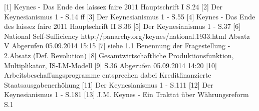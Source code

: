 \documentclass[
      onecolumn,
      a4paper,
      abstracton,
      parskip=half
      ,final
      ]{scrartcl}
\begin{document}
[1] Keynes - Das Ende des laissez faire 2011 Hauptschrift I S.24
[2] Der Keynesianismus 1 - S.14 ff
[3] Der Keynesianismus 1 - S.55
[4] Keynes - Das Ende des laissez faire 2011 Hauptschrift II S.36
[5] Der Keynesianismus 1 - S.37
[6] National Self-Sufficiency http://panarchy.org/keynes/national.1933.html
  Absatz V Abgerufen 05.09.2014 15:15
[7] siehe 1.1 Benennung der Fragestellung - 2.Absatz (Def. Revolution)
[8] Gesamtwirtschaftliche Produktionsfunktion, Multiplikator, IS-LM-Modell
[9] %
  S.36 Abgerufen 05.09.2014 14:20
[10] Arbeitsbeschaffungsprogramme entsprechen dabei Kreditfinanzierte Staatsausgabenerh{\"o}hung
[11] Der Keynesianismus 1 - S.111
[12] Der Keynesianismus 1 - S.181
[13] J.M. Keynes - Ein Traktat {\"u}ber W{\"a}hrungsreform S.1
\end{document}
